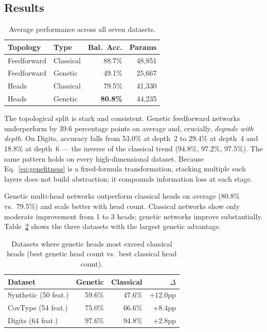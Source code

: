 \documentclass[10pt, a4paper, twocolumn]{article}
\begin{document}
\subsection*{Results}

\begin{table}[ht]
  \small
  \centering
  \caption{Average performance across all seven datasets.}
  \label{tab:layer_summary}
  \setlength{\tabcolsep}{5pt}
  \begin{tabularx}{\linewidth}{@{}X X r r@{}}
    \toprule
    \textbf{Topology} & \textbf{Type} & \textbf{Bal.\ Acc.} & \textbf{Params} \\
    \midrule
    Feedforward & Classical & 88.7\%          & 48,851 \\
    Feedforward & Genetic   & 49.1\%          & 25,667 \\
    Heads       & Classical & 79.5\%          & 41,330 \\
    Heads       & Genetic   & \textbf{80.8\%} & 44,235 \\
    \bottomrule
  \end{tabularx}
\end{table}

The topological split is stark and consistent. Genetic feedforward networks underperform by 39.6 percentage points on average and, crucially, \emph{degrade with depth}. On Digits, accuracy falls from 53.0\% at depth~2 to 29.4\% at depth~4 and 18.8\% at depth~6 --- the inverse of the classical trend (94.8\%, 97.2\%, 97.5\%). The same pattern holds on every high-dimensional dataset. Because Eq.~\eqref{eq:genefitness} is a fixed-formula transformation, stacking multiple such layers does not build abstraction; it compounds information loss at each stage.

Genetic multi-head networks outperform classical heads on average (80.8\% vs.\ 79.5\%) and scale better with head count. Classical networks show only moderate improvement from 1 to 3 heads; genetic networks improve substantially. Table~\ref{tab:layer_wins} shows the three datasets with the largest genetic advantage.

\begin{table}[ht]
  \small
  \centering
  \caption{Datasets where genetic heads most exceed classical heads (best genetic head count vs.\ best classical head count).}
  \label{tab:layer_wins}
  \setlength{\tabcolsep}{4pt}
  \begin{tabularx}{\linewidth}{@{}X r r r@{}}
    \toprule
    \textbf{Dataset} & \textbf{Genetic} & \textbf{Classical} & $\Delta$ \\
    \midrule
    Synthetic (50 feat.) & 59.6\% & 47.6\% & +12.0pp \\
    CovType   (54 feat.) & 75.0\% & 66.6\% & \phantom{0}+8.4pp \\
    Digits    (64 feat.) & 97.6\% & 94.8\% & \phantom{0}+2.8pp \\
    \bottomrule
  \end{tabularx}
\end{table}
\end{document}
